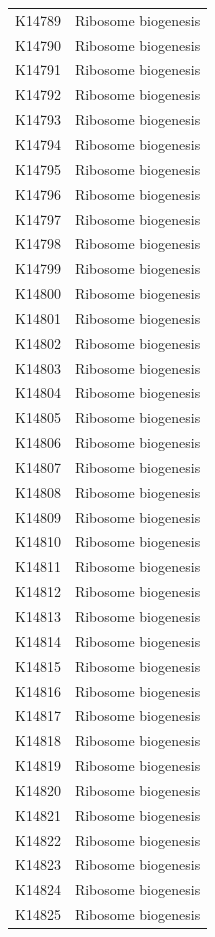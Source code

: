 \begin{longtable}{@{}l l@{}}
K14789 & Ribosome biogenesis \\
K14790 & Ribosome biogenesis \\
K14791 & Ribosome biogenesis \\
K14792 & Ribosome biogenesis \\
K14793 & Ribosome biogenesis \\
K14794 & Ribosome biogenesis \\
K14795 & Ribosome biogenesis \\
K14796 & Ribosome biogenesis \\
K14797 & Ribosome biogenesis \\
K14798 & Ribosome biogenesis \\
K14799 & Ribosome biogenesis \\
K14800 & Ribosome biogenesis \\
K14801 & Ribosome biogenesis \\
K14802 & Ribosome biogenesis \\
K14803 & Ribosome biogenesis \\
K14804 & Ribosome biogenesis \\
K14805 & Ribosome biogenesis \\
K14806 & Ribosome biogenesis \\
K14807 & Ribosome biogenesis \\
K14808 & Ribosome biogenesis \\
K14809 & Ribosome biogenesis \\
K14810 & Ribosome biogenesis \\
K14811 & Ribosome biogenesis \\
K14812 & Ribosome biogenesis \\
K14813 & Ribosome biogenesis \\
K14814 & Ribosome biogenesis \\
K14815 & Ribosome biogenesis \\
K14816 & Ribosome biogenesis \\
K14817 & Ribosome biogenesis \\
K14818 & Ribosome biogenesis \\
K14819 & Ribosome biogenesis \\
K14820 & Ribosome biogenesis \\
K14821 & Ribosome biogenesis \\
K14822 & Ribosome biogenesis \\
K14823 & Ribosome biogenesis \\
K14824 & Ribosome biogenesis \\
K14825 & Ribosome biogenesis \\

\end{longtable}
